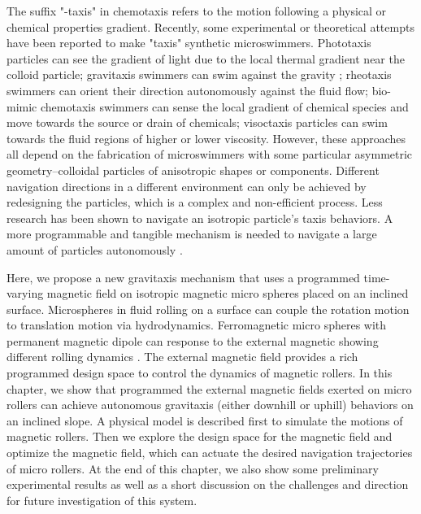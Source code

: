 The suffix "-taxis" in chemotaxis refers to the motion following a physical or chemical properties gradient. Recently, some experimental or theoretical attempts have been reported to make "taxis" synthetic microswimmers. Phototaxis particles can see the gradient of light due to the local thermal gradient near the colloid particle\autocite{yu2019phototaxis,dai2016programmable,lozano2016phototaxis,chen2017light}; gravitaxis swimmers can swim against the gravity \autocite{campbell2013gravitaxis,ten2014gravitaxis}; rheotaxis swimmers can orient their direction autonomously against the fluid flow\autocite{Palacci2015,ren2017rheotaxis,brosseau2019relating}; bio-mimic chemotaxis swimmers can sense the local gradient of chemical species and move towards the source or drain of chemicals\autocite{dou2019autonomous}; visoctaxis particles can swim towards the fluid regions of higher or lower viscosity\autocite{liebchen2018viscotaxis}. However, these approaches all depend on the fabrication of microswimmers with some particular asymmetric geometry--colloidal particles of anisotropic shapes or components. Different navigation directions in a different environment can only be achieved by redesigning the particles, which is a complex and non-efficient process. Less research has been shown to navigate an isotropic particle's taxis behaviors. A more programmable and tangible mechanism is needed to navigate a large amount of particles autonomously \autocite{dou2019autonomous}.

Here, we propose a new gravitaxis mechanism that uses a programmed time-varying magnetic field on isotropic magnetic micro spheres placed on an inclined surface. Microspheres in fluid rolling on a surface can couple the rotation motion to translation motion via hydrodynamics\autocite{galvin2001time,rashidi2016theoretical}. Ferromagnetic micro spheres with permanent magnetic dipole  can response to the external  magnetic showing different rolling dynamics \autocite{helgesen2019propulsion,helgesen2018magnetic}.
The external magnetic field provides a rich programmed design space to control the dynamics of magnetic rollers.
In this chapter, we show that programmed the external magnetic fields exerted on  micro rollers can achieve autonomous gravitaxis (either downhill or uphill) behaviors on an inclined slope. A physical model is described first to simulate the motions of magnetic rollers. Then we explore the design space for the magnetic field  and optimize the magnetic field, which can actuate the desired navigation trajectories of micro rollers. At the end of this chapter, we also show some preliminary experimental results as well as a short discussion on the challenges and direction for future investigation of this system.
